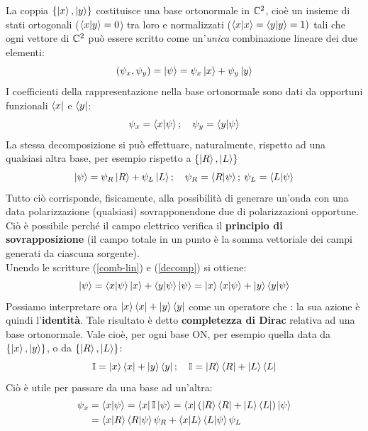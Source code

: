 \documentclass[FisicaTeorica.tex]{subfiles}
\begin{document}
La coppia $\{\ket{x},\ket{y}\}$ costituisce una base ortonormale in $\mathbb{C}^2$, cioè un insieme di stati ortogonali ($\braket{x|y} = 0$) tra loro e normalizzati ($\braket{x|x} = \braket{y|y} = 1)$ tali che ogni vettore di $\mathbb{C}^2$ può essere scritto come un'\textit{unica} combinazione lineare dei due elementi:
\begin{equation}
    (\psi_x, \psi_y) = \ket{\psi} = \psi_x \ket{x} + \psi_y \ket{y}
    \label{comb-lin}
\end{equation} %
I coefficienti della rappresentazione nella base ortonormale sono dati da opportuni funzionali $\bra{x}$ e $\bra{y}$:
\[
\psi_x = \braket{x|\psi}; \quad \psi_y = \braket{y|\psi}
\label{decomp}
\]
La stessa decomposizione si può effettuare, naturalmente, rispetto ad una qualsiasi altra base, per esempio rispetto a $\{\ket{R}, \ket{L}\}$
\[
\ket{\psi} = \psi_R \ket{R} + \psi_L \ket{L}; \quad \psi_R = \braket{R|\psi}; \> \psi_L = \braket{L|\psi}
\]
Tutto ciò corrisponde, fisicamente, alla possibilità di generare un'onda con una data polarizzazione (qualsiasi) sovrapponendone due di polarizzazioni opportune. Ciò è possibile perché il campo elettrico verifica il \textbf{principio di sovrapposizione} (il campo totale in un punto è la somma vettoriale dei campi generati da ciascuna sorgente).\\
Unendo le scritture (\ref{comb-lin}) e (\ref{decomp}) si ottiene:
\[
\ket{\psi} = \braket{x|\psi}\ket{x} + \braket{y|\psi}\ket{\psi} = \ket{x}\braket{x|\psi} + \ket{y}\braket{y|\psi}
\]
Possiamo interpretare ora $\ket{x}\bra{x} + \ket{y}\bra{y}$ come un operatore che : la sua azione è quindi l'\textbf{identità}. Tale risultato è detto \textbf{completezza di Dirac} relativa ad una base ortonormale. Vale cioè, per ogni base ON, per esempio quella data da $\{\ket{x}, \ket{y}\}$, o da $\{\ket{R}, \ket{L}\}$:
\[
\mathbb{I} = \ket{x}\bra{x} + \ket{y}\bra{y}; \quad \mathbb{I} = \ket{R}\bra{R} + \ket{L}\bra{L}
\]
Ciò è utile per passare da una base ad un'altra:
\begin{align*}
\psi_x &= \braket{x|\psi} = \bra{x}\mathbb{I}\ket{\psi} = \bra{x} (\ket{R}\bra{R} + \ket{L}\bra{L}) \ket{\psi}\\ &= \braket{x|R}\braket{R|\psi}\psi_R + \braket{x|L}\braket{L|\psi}\psi_L
\end{align*}
\end{document}
